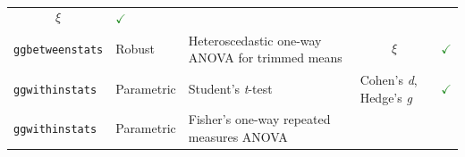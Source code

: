 \documentclass[]{article}
\begin{document}
\begin{longtable}[]{@{}lllll@{}}
\begin{minipage}[t]{0.12\columnwidth}
\[\xi\]\strut
\end{minipage} & \begin{minipage}[t]{0.07\columnwidth}\raggedright
\textcolor{ForestGreen}{$\checkmark$}\strut
\end{minipage}\tabularnewline
\begin{minipage}[t]{0.20\columnwidth}\raggedright
\texttt{ggbetweenstats}\strut
\end{minipage} & \begin{minipage}[t]{0.16\columnwidth}\raggedright
Robust\strut
\end{minipage} & \begin{minipage}[t]{0.31\columnwidth}\raggedright
Heteroscedastic one-way ANOVA for trimmed means\strut
\end{minipage} & \begin{minipage}[t]{0.12\columnwidth}\raggedright
\[\xi\]\strut
\end{minipage} & \begin{minipage}[t]{0.07\columnwidth}\raggedright
\textcolor{ForestGreen}{$\checkmark$}\strut
\end{minipage}\tabularnewline
\begin{minipage}[t]{0.20\columnwidth}\raggedright
\texttt{ggwithinstats}\strut
\end{minipage} & \begin{minipage}[t]{0.16\columnwidth}\raggedright
Parametric\strut
\end{minipage} & \begin{minipage}[t]{0.31\columnwidth}\raggedright
Student's \emph{t}-test\strut
\end{minipage} & \begin{minipage}[t]{0.12\columnwidth}\raggedright
Cohen's \emph{d}, Hedge's \emph{g}\strut
\end{minipage} & \begin{minipage}[t]{0.07\columnwidth}\raggedright
\textcolor{ForestGreen}{$\checkmark$}\strut
\end{minipage}\tabularnewline
\begin{minipage}[t]{0.20\columnwidth}\raggedright
\texttt{ggwithinstats}\strut
\end{minipage} & \begin{minipage}[t]{0.16\columnwidth}\raggedright
Parametric\strut
\end{minipage} & \begin{minipage}[t]{0.31\columnwidth}\raggedright
Fisher's one-way repeated measures ANOVA\strut
\end{minipage} & \begin{minipage}[t]{0.12\columnwidth}\raggedright

\end{minipage}
\end{longtable}
\end{document}
